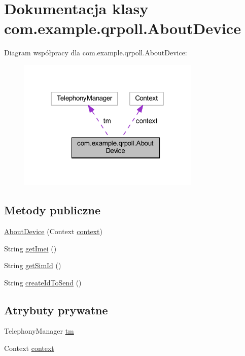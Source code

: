 \hypertarget{classcom_1_1example_1_1qrpoll_1_1_about_device}{\section{Dokumentacja klasy com.\+example.\+qrpoll.\+About\+Device}
\label{classcom_1_1example_1_1qrpoll_1_1_about_device}
}


Diagram współpracy dla com.\+example.\+qrpoll.\+About\+Device\+:
\nopagebreak
\begin{figure}[H]
\begin{center}
\leavevmode
\includegraphics[width=246pt]{classcom_1_1example_1_1qrpoll_1_1_about_device__coll__graph}
\end{center}
\end{figure}
\subsection*{Metody publiczne}
\begin{DoxyCompactItemize}
\item 
\hyperlink{classcom_1_1example_1_1qrpoll_1_1_about_device_a45606e33a90b2bb3e1824f1d742e2825}{About\+Device} (Context \hyperlink{classcom_1_1example_1_1qrpoll_1_1_about_device_a11363ff16b18fc93f7a1f019e116b416}{context})
\item 
String \hyperlink{classcom_1_1example_1_1qrpoll_1_1_about_device_a1f98f79c75c43e7151af8d414fcae88f}{get\+Imei} ()
\item 
String \hyperlink{classcom_1_1example_1_1qrpoll_1_1_about_device_a4b4098442ec3ea6028f1a8f9dc0f79b2}{get\+Sim\+Id} ()
\item 
String \hyperlink{classcom_1_1example_1_1qrpoll_1_1_about_device_a16cce5d65f255d5af26358b683dff453}{create\+Id\+To\+Send} ()
\end{DoxyCompactItemize}
\subsection*{Atrybuty prywatne}
\begin{DoxyCompactItemize}
\item 
Telephony\+Manager \hyperlink{classcom_1_1example_1_1qrpoll_1_1_about_device_a75cbf05bb659a888a3e6cfec68881775}{tm}
\item 
Context \hyperlink{classcom_1_1example_1_1qrpoll_1_1_about_device_a11363ff16b18fc93f7a1f019e116b416}{context}
\end{DoxyCompactItemize}


